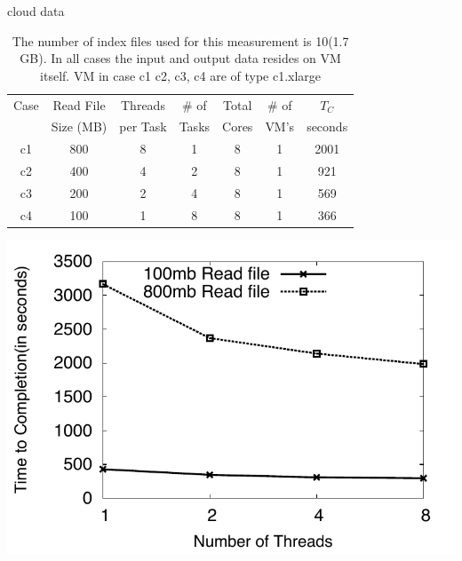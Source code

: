\documentclass{article}
\begin{document}
cloud data
 \begin{table}
 \small
 \begin{tabular}{|c|c|c|c|c|c|c|} 
 \hline 
 Case&Read File&Threads  & \# of & Total & \# of  &  $T_C$  \\ 
     & Size (MB) & per Task & Tasks & Cores &  VM's & seconds \\ 
\hline
c1 & 800  &8 & 1 &  8 & 1 &2001  \\\hline
c2 & 400 &4 & 2 &  8 & 1 &921 \\\hline
c3 & 200 &2 & 4 &  8 & 1 &569 \\\hline
c4 & 100 &1 & 8 &  8 & 1 &366 \\\hline

\hline

 \end{tabular}

 \caption{ The number of index files used for this measurement is 10(1.7 GB).
   In all cases the input and output data resides on VM itself.  VM in
   case c1 c2, c3, c4 are of type c1.xlarge }
  \label{table:cloud-VM} 
\end{table}






\includegraphics[scale=0.66]{../figures/cloud_threadsvstime.pdf} 
\end{document}
